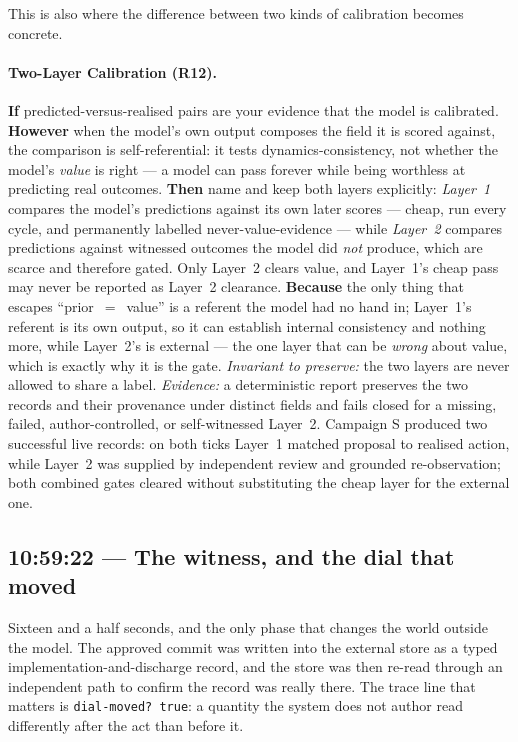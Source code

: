 This is also where the difference between two kinds of calibration becomes
concrete.

\paragraph{Two-Layer Calibration (R12).} \textbf{If} predicted-versus-realised pairs are your evidence that the model is calibrated. \textbf{However} when the model's own output composes the field it is scored against, the comparison is self-referential: it tests dynamics-consistency, not whether the model's \emph{value} is right --- a model can pass forever while being worthless at predicting real outcomes. \textbf{Then} name and keep both layers explicitly: \emph{Layer~1} compares the model's predictions against its own later scores --- cheap, run every cycle, and permanently labelled never-value-evidence --- while \emph{Layer~2} compares predictions against witnessed outcomes the model did \emph{not} produce, which are scarce and therefore gated.  Only Layer~2 clears value, and Layer~1's cheap pass may never be reported as Layer~2 clearance. \textbf{Because} the only thing that escapes ``prior~$=$~value'' is a referent the model had no hand in; Layer~1's referent is its own output, so it can establish internal consistency and nothing more, while Layer~2's is external --- the one layer that can be \emph{wrong} about value, which is exactly why it is the gate.  \emph{Invariant to preserve:} the two layers are never allowed to share a label.  \emph{Evidence:} a deterministic report preserves the two records and their provenance under distinct fields and fails closed for a missing, failed, author-controlled, or self-witnessed Layer~2.  Campaign S produced two successful live records: on both ticks Layer~1 matched proposal to realised action, while Layer~2 was supplied by independent review and grounded re-observation; both combined gates cleared without substituting the cheap layer for the external one.

\subsection*{10:59:22 --- The witness, and the dial that moved}

Sixteen and a half seconds, and the only phase that changes the world outside
the model.  The approved commit was written into the external store as a typed
implementation-and-discharge record, and the store was then re-read through an
independent path to confirm the record was really there.  The trace line that
matters is \texttt{dial-moved?\ true}: a quantity the system does not author
read differently after the act than before it.

